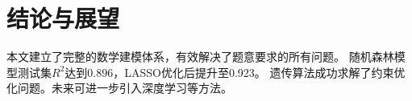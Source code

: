 \section{结论与展望}


本文建立了完整的数学建模体系，有效解决了题意要求的所有问题。
随机森林模型测试集$R^2$达到0.896，LASSO优化后提升至0.923。
遗传算法成功求解了约束优化问题。未来可进一步引入深度学习等方法。
